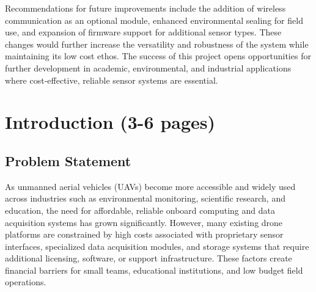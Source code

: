\documentclass[12pt]{article}
\begin{document}
\par Recommendations for future improvements include the addition of wireless communication as an optional module, enhanced environmental sealing for field use, and expansion of firmware support for additional sensor types. These changes would further increase the versatility and robustness of the system while maintaining its low cost ethos. The success of this project opens opportunities for further development in academic, environmental, and industrial applications where cost-effective, reliable sensor systems are essential.

\newpage
\tableofcontents
\newpage

\section{Introduction (3-6 pages)}
\subsection{Problem Statement}

\par As unmanned aerial vehicles (UAVs) become more accessible and widely used across industries such as environmental monitoring, scientific research, and education, the need for affordable, reliable onboard computing and data acquisition systems has grown significantly. However, many existing drone platforms are constrained by high costs associated with proprietary sensor interfaces, specialized data acquisition modules, and storage systems that require additional licensing, software, or support infrastructure. These factors create financial barriers for small teams, educational institutions, and low budget field operations.
\end{document}
